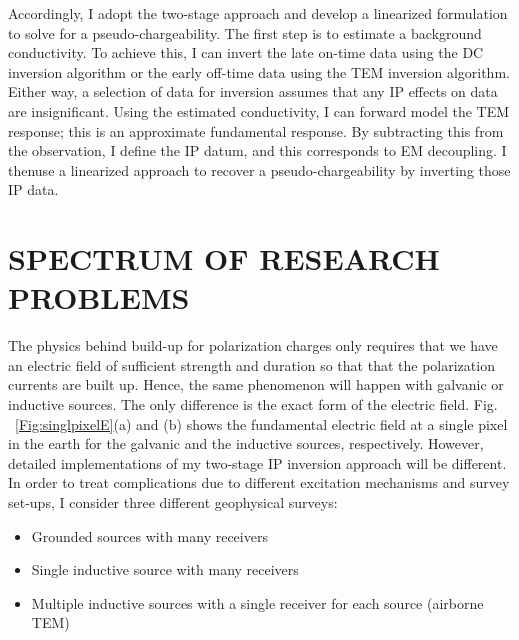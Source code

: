 \documentclass[letterpaper,11pt]{article}
\begin{document}


Accordingly, I adopt the two-stage approach and develop a linearized formulation to solve for a pseudo-chargeability. The first step  is to estimate a background conductivity. To achieve this, I  can invert the late on-time data using the DC inversion algorithm or the early off-time data using the TEM inversion algorithm. Either way, a selection of data for inversion assumes that any IP effects on data are insignificant. Using the estimated conductivity, I can  forward model the TEM response; this is an approximate fundamental response. By subtracting this from the observation, I define the IP datum, and this corresponds to EM decoupling. I thenuse a linearized approach to recover a pseudo-chargeability by inverting those IP data. 

\section{SPECTRUM OF RESEARCH PROBLEMS}
The physics behind build-up for polarization charges only requires that we have an electric field of sufficient strength and duration so that that the polarization currents are built up. Hence, the same phenomenon will happen with galvanic or inductive sources. The only difference is the exact form of the electric field. Fig. ~\ref{Fig:singlpixelE}(a) and (b) shows the fundamental electric field at a single pixel in the earth for the galvanic and the inductive sources, respectively. However, detailed implementations of my two-stage IP inversion approach will be different. In order to treat complications due to different excitation mechanisms and survey set-ups, I consider three different geophysical surveys:
\begin{itemize}
  \item Grounded sources with many receivers
  \item Single inductive source with many receivers
  \item Multiple inductive sources with a single receiver for each source (airborne TEM)
\end{itemize}
\end{document}
